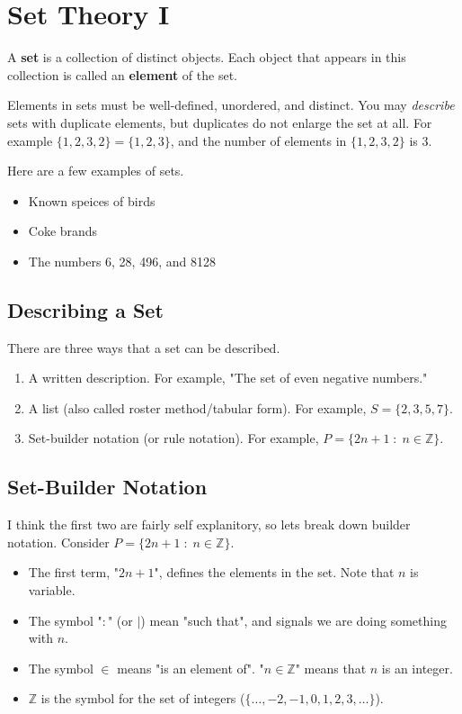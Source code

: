 \chapter{Set Theory I}

\mydefine
{
	A {\bf set} is a collection of distinct objects. Each object that appears in this collection is called an {\bf element} of the set.
}

Elements in sets must be well-defined, unordered, and distinct. You may \emph{describe} sets with duplicate elements, but duplicates do not enlarge the set at all. For example $\{1,2,3,2\}=\{1,2,3\}$, and the number of elements in $\{1,2,3,2\}$ is 3.

\myexample
{
	Here are a few examples of sets.
	\begin{itemize}
		\item Known speices of birds
		\item Coke brands
		\item The numbers 6, 28, 496, and 8128
	\end{itemize}
}

\section{Describing a Set}

There are three ways that a set can be described.

\begin{enumerate}
	\item A written description. For example, "The set of even negative numbers."
	\item A list (also called roster method/tabular form). For example, $S = \{2,3,5,7\}$.
	\item Set-builder notation (or rule notation). For example, $P = \{2n+1\;:\;n \in \mathbb{Z}\}$.
\end{enumerate}

\section{Set-Builder Notation}

I think the first two are fairly self explanitory, so lets break down builder notation. Consider $P = \{2n+1\;:\;n \in \mathbb{Z}\}$.

\begin{itemize}
	\item The first term, "$2n+1$", defines the elements in the set. Note that $n$ is variable.
	\item The symbol "$:$" (or $|$) mean "such that", and signals we are doing something with $n$.
	\item The symbol $\in$ means "is an element of". "$n \in \mathbb{Z}$" means that $n$ is an integer.
	\item $\mathbb{Z}$ is the symbol for the set of integers ($\{\dots,-2,-1,0,1,2,3,\dots\}$).
\end{itemize}


